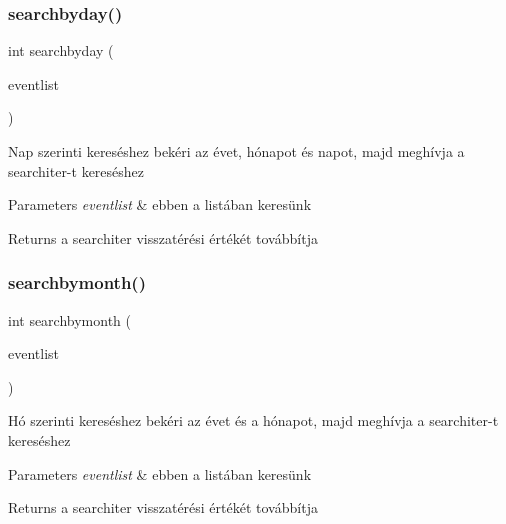 \subsubsection{\texorpdfstring{searchbyday()}{searchbyday()}}
{\footnotesize\ttfamily int searchbyday (\begin{DoxyParamCaption}\item[{\hyperlink{struct_event_list}{Event\+List} $\ast$}]{eventlist }\end{DoxyParamCaption})}

Nap szerinti kereséshez bekéri az évet, hónapot és napot, majd meghívja a searchiter-\/t kereséshez 
\begin{DoxyParams}{Parameters}
{\em eventlist} & ebben a listában keresünk \\
\hline
\end{DoxyParams}
\begin{DoxyReturn}{Returns}
a searchiter visszatérési értékét továbbítja 
\end{DoxyReturn}
\mbox{\label{group__search_gac2a6873263c1a8146c04126b48f8431e}} 
\subsubsection{\texorpdfstring{searchbymonth()}{searchbymonth()}}
{\footnotesize\ttfamily int searchbymonth (\begin{DoxyParamCaption}\item[{\hyperlink{struct_event_list}{Event\+List} $\ast$}]{eventlist }\end{DoxyParamCaption})}

Hó szerinti kereséshez bekéri az évet és a hónapot, majd meghívja a searchiter-\/t kereséshez 
\begin{DoxyParams}{Parameters}
{\em eventlist} & ebben a listában keresünk \\
\hline
\end{DoxyParams}
\begin{DoxyReturn}{Returns}
a searchiter visszatérési értékét továbbítja 
\end{DoxyReturn}
\mbox{\label{group__search_gadaf3bc7221b1fe4f2cffb3aaea00415d}} 
